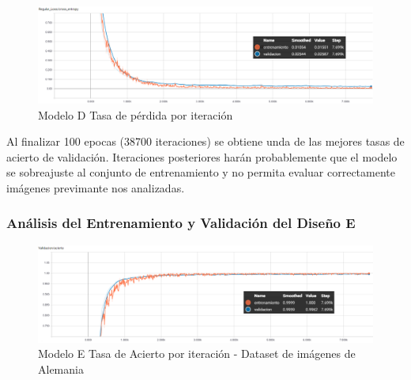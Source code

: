 			\begin{figure}[H]
				\begin{center}
				\includegraphics[width=1\textwidth]{images/desarrollo/trainResults/peru/model6Loss} 
				\end{center}
				\begin{center}
				\caption{\small{Modelo D Tasa de pérdida por iteración}}
				
				{\small{\fontsize{10}{16.8}\selectfont {Fuente: Elaboración propia}}}
				\end{center}
				\vspace{-1.5em}
			\end{figure}

			Al finalizar 100 epocas (38700 iteraciones) se obtiene unda de las mejores tasas de acierto de validación. Iteraciones posteriores harán probablemente que el modelo se sobreajuste al conjunto de entrenamiento y no permita evaluar correctamente imágenes previmante nos analizadas.
			

		\subsubsection{Análisis del Entrenamiento y Validación del Diseño E} 
			\begin{figure}[H]
				\begin{center}
				\includegraphics[width=1\textwidth]{images/desarrollo/trainResults/peru/model7Acierto} 
				\end{center}
				\begin{center}
				\caption{\small{Modelo E Tasa de Acierto por iteración - Dataset de imágenes de Alemania  }}
				
				{\small{\fontsize{10}{16.8}\selectfont {Fuente: Elaboración propia}}}
				\end{center}
				\vspace{-1.5em}
			\end{figure}
		
